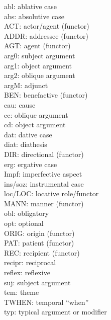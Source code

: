 \documentclass[english]{textolivre}
\begin{document}
abl: ablative case \\
abs: absolutive case \\
ACT: actor/agent (functor) \\
ADDR: addressee (functor) \\
AGT: agent (functor) \\
arg0: subject argument  \\
arg1: object argument \\
arg2: oblique argument \\
argM: adjunct \\
BEN: benefactive (functor) \\
cau: cause \\ 
cc: oblique argument \\
cd: object argument \\
dat: dative case \\
diat: diathesis \\
DIR: directional (functor) \\
erg: ergative case \\
Impf: imperfective aspect \\
ins/soz: instrumental case \\
loc/LOC: locative role/functor \\
MANN: manner (functor) \\
obl: obligatory \\
opt: optional \\
ORIG: origin (functor) \\
PAT: patient (functor) \\
REC: recipient (functor) \\
recipr: reciprocal \\
reflex: reflexive \\
suj: subject argument \\
tem: theme \\
TWHEN: temporal “when” \\
typ: typical argument or modifier 
\end{document}
